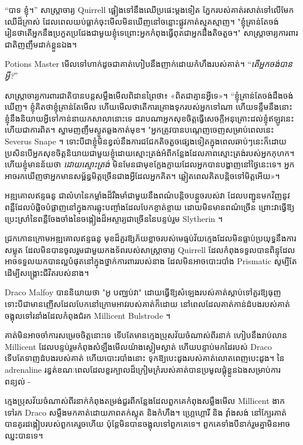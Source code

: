 {{“បាទ ខ្ញុំ។” សាស្ត្រាចារ្យ Quirrell ផ្អៀង​ទៅ​នឹង​ឈើ​ប្រផេះ​ម្ដង​ទៀត ភ្នែក​របស់​គាត់​រសាត់​ទៅ​លើ​មែក​ឈើ​ដ៏​ក្រាស់ ដែល​ពេល​យប់​ធ្លាក់​ចុះ​មើល​មិន​ឃើញ​នៅ​ចន្លោះ​ផ្លូវ​កាត់​ស្មុគស្មាញ។ "ខ្ញុំគ្រាន់តែចង់រៀនថាតើអ្នកនឹងប្រកួតប្រជែងជាមួយខ្ញុំទេព្រោះអ្នកកំពុងធ្វើពុតជាអ្នកដឹងតិចតួច។" សាស្ត្រាចារ្យការពារជាតិញញឹមដាក់ខ្លួនឯង។

Potions Master មើលទៅហាក់ដូចជាគាត់ហៀបនឹងញាក់ដោយកំហឹងរបស់គាត់។ “\emph{តើអ្នកចង់បានអ្វី?}”

សាស្ត្រាចារ្យ​ការពារ​ជាតិ​បាន​បន្ត​សម្លឹង​មើល​ពិដាន​ព្រៃ​ថា៖ «ពិត​ជា​គ្មាន​អ្វី​ទេ»។ “ខ្ញុំគ្រាន់តែចង់ដឹងចង់ឃើញ។ ខ្ញុំគិតថាខ្ញុំគ្រាន់តែមើល ហើយមើលថាតើការគ្រោងទុករបស់អ្នកទៅណា ហើយទន្ទឹមនឹងនោះ ខ្ញុំនឹងនិយាយអ្វីទៅកាន់នាយកសាលានោះទេ ដរាបណាអ្នកសុខចិត្តធ្វើសេចក្តីអនុគ្រោះដល់ខ្ញុំឥឡូវនេះ ហើយជាការពិត។ ស្នាមញញឹមស្ងួតឆ្លងកាត់មុខ។ "អ្នកត្រូវបានបណ្តេញចេញសម្រាប់ពេលនេះ Severus Snape ។ ទោះបីជាខ្ញុំមិនខ្វល់នឹងការជជែកតិចតួចផ្សេងទៀតក្នុងពេលឆាប់ៗនេះក៏ដោយ ប្រសិនបើអ្នកសុខចិត្តនិយាយជាមួយខ្ញុំដោយស្មោះត្រង់អំពីកន្លែងដែលភាពស្មោះត្រង់របស់អ្នកកុហក។ ហើយខ្ញុំមានន័យថា \emph{ដោយស្មោះត្រង់} មិនមែនជាមុខក្លែងក្លាយដែលអ្នកបានបង្ហាញនៅថ្ងៃនេះទេ។ អ្នកអាចរកឃើញថាអ្នកមានសម្ព័ន្ធមិត្តច្រើនជាងអ្វីដែលអ្នកគិត។ ឆ្លៀត​ពេល​គិត​បន្តិច​ទៅ​មិត្ត​អើយ»។


អឌ្ឍគោលឥន្ទធនូ ជាលំហនៃកម្លាំងដ៏រឹងមាំជាមួយនឹងពណ៌បន្តិចបន្តួចរបស់វា ដែលបញ្ជូនមកវិញនូវពន្លឺដែលបំផ្លិចបំផ្លាញនៅក្នុងការឆ្លុះបញ្ចាំងដែលបែកខ្ចាត់ខ្ចាយ ដោយមិនមានពណ៌ច្រើន ព្រោះវាធ្វើឱ្យប្រេះស្រាំនៃពន្លឺចែងចាំងនៃចង្កៀងដ៏អស្ចារ្យជាច្រើននៃបន្ទប់រួម Slytherin ។

ជ្រកកោនក្រោមអឌ្ឍគោលឥន្ទធនូ មុខដ៏គួរឱ្យភ័យខ្លាចរបស់មេធ្មប់វ័យក្មេងដែលមិនធ្លាប់ប្រយុទ្ធនឹងការសម្លុត ដែលមិនបានចូលរួមជាមួយកងទ័ពរបស់សាស្រ្តាចារ្យ Quirrell ដែលកំពុងទទួលបានពិន្ទុដែលអាចទទួលយកបានល្អបំផុតនៅក្នុងថ្នាក់ការពាររបស់នាង ដែលមិនអាចបោះរបាំង Prismatic សូម្បីតែ ដើម្បីសង្គ្រោះជីវិតរបស់នាង។

Draco Malfoy បាននិយាយថា "អូ បញ្ឈប់វា" ដោយធ្វើឱ្យសំឡេងរបស់គាត់ស្តាប់ទៅគួរឱ្យធុញ ទោះបីជាមានញើសដែលបែកនៅក្រោមអាវរបស់គាត់ក៏ដោយ នៅពេលដែលគាត់កាន់ដំបងរបស់គាត់ចង្អុលទៅរនាំងដែលកំពុងជំរក Millicent Bulstrode ។

គាត់មិនអាចចាំការសម្រេចចិត្តនោះទេ ទើបតែមានក្មេងប្រុសវ័យចំណាស់ពីរនាក់ ហៀបនឹងរាប់លាន Millicent ដែលបន្ទប់រួមកំពុងសំឡឹងមើលយ៉ាងស្ងៀមស្ងាត់ ហើយបន្ទាប់មកដៃរបស់ Draco ទើបតែទាញដំបងរបស់គាត់ ហើយបោះរបាំងនោះ ទុកឱ្យបេះដូងរបស់គាត់លោតពេញបេះដូង។ នៃ adrenaline រន្ធត់ខណៈពេលដែលខួរក្បាលដ៏ក្រៀមក្រំរបស់គាត់បានប្រមូលផ្តុំខ្លួនឯងសម្រាប់ការពន្យល់ -

ក្មេងប្រុសវ័យចំណាស់ពីរនាក់កំពុងតម្រង់ជួរពីកន្លែងដែលពួកគេកំពុងសម្លឹងមើល Millicent ងាកទៅរក Draco សម្លឹងមកគាត់ដោយភាពតក់ស្លុត និងកំហឹង។ ហ្គ្រេហ្គោរី និង វ៉ាំងសង់ នៅក្បែរគាត់ បានគូរដង្កៀបរបស់ពួកគេរួចហើយ ប៉ុន្តែមិនបានចង្អុលទៅពួកគេទេ។ ពួក​គេ​ទាំង​បី​នាក់​រួម​គ្នា​មិន​អាច​ឈ្នះ​បាន​ទេ។

}}
